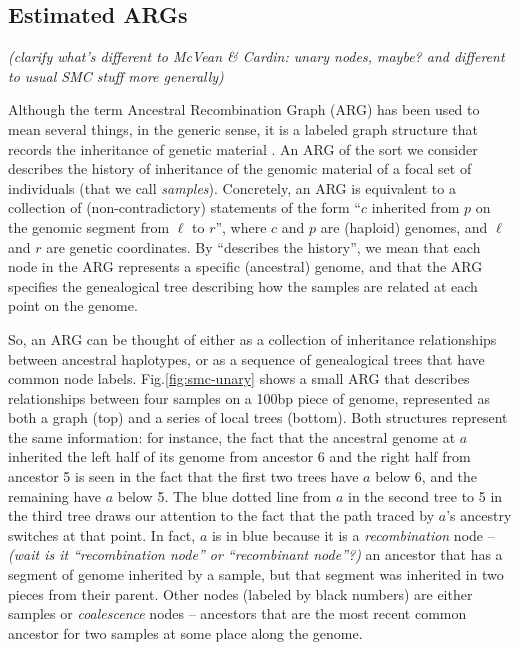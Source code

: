 \documentclass{article}
\newcommand{\comment}[1]{{\it \color{orange} (#1)}}
\begin{document}
\subsection{Estimated ARGs} \label{par:recording}

\comment{clarify what's different to McVean \& Cardin: unary nodes, maybe? and different to usual SMC stuff more generally}

Although the term Ancestral Recombination Graph (ARG) has been used to mean several things,
in the generic sense, it is a labeled graph structure that records
the inheritance of genetic material \citep{wong_general_2023}.
An ARG of the sort we consider describes the history of inheritance
of the genomic material of a focal set of individuals (that we call \emph{samples}).
Concretely, an ARG is equivalent to a collection of (non-contradictory) statements
of the form ``$c$ inherited from $p$ on the genomic segment from $\ell$ to $r$'',
where $c$ and $p$ are (haploid) genomes, and $\ell$ and $r$ are genetic coordinates.
By ``describes the history'',
we mean that each node in the ARG represents a specific (ancestral) genome,
and that the ARG specifies the genealogical tree describing how the samples are related
at each point on the genome.

So, an ARG can be thought of either as a collection of inheritance relationships
between ancestral haplotypes,
or as a sequence of genealogical trees that have common node labels.
Fig.\ref{fig:smc-unary} shows a small ARG
that describes relationships between four samples on a 100bp piece of genome,
represented as both a graph (top) and a series of local trees (bottom).
Both structures represent the same information:
for instance, the fact that the ancestral genome at $a$
inherited the left half of its genome from ancestor 6
and the right half from ancestor 5
is seen in the fact that the first two trees have $a$ below 6,
and the remaining have $a$ below 5.
The blue dotted line from $a$ in the second tree to 5 in the third tree
draws our attention to the fact that
the path traced by $a$'s ancestry switches at that point.
In fact, $a$ is in blue because it is a \emph{recombination} node --
\comment{wait is it ``recombination node'' or ``recombinant node''?}
an ancestor that has a segment of genome inherited by a sample,
but that segment was inherited in two pieces from their parent.
Other nodes (labeled by black numbers) are either samples
or \emph{coalescence} nodes --
ancestors that are the most recent common ancestor for two samples
at some place along the genome.
\end{document}
